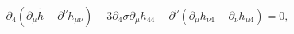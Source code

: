 \begin{equation}\label{mu-4}
\partial_4 ( \partial_\mu \tilde h - \partial^\nu  h_{\mu\nu})-
3\partial_4 \sigma \partial_\mu h_{44} -
\partial^{\nu}\left(\partial_{\mu}h_{\nu 4}-\partial_{\nu}h_{\mu 4}\right)= 0,
\end{equation}

